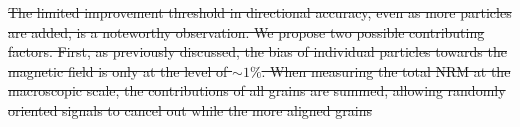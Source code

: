 \documentclass[onecolumn,12pt,a4paper]{article}
\providecommand{\DIFdeltex}[1]{{\protect\color{red}\sout{#1}}}                      %
\providecommand{\DIFaddbegin}{} %
\providecommand{\DIFdelbegin}{} %
\providecommand{\DIFdelend}{} %
\providecommand{\DIFdel}[1]{\texorpdfstring{\DIFdeltex{#1}}{}} %
\newcommand{\DIFscaledelfig}{0.5}
\newlength{\DIFdelgraphicswidth} %
\newlength{\DIFdelgraphicsheight} %
\newcommand{\DIFaddincludegraphics}[2][]{{\color{blue}\fbox{\DIFOincludegraphics[#1]{#2}}}} %
\newcommand{\DIFdelincludegraphics}[2][]{%
\sbox{\DIFdelgraphicsbox}{\DIFOincludegraphics[#1]{#2}}%
\settoboxwidth{\DIFdelgraphicswidth}{\DIFdelgraphicsbox} %
\settoboxtotalheight{\DIFdelgraphicsheight}{\DIFdelgraphicsbox} %
\scalebox{\DIFscaledelfig}{%
\parbox[b]{\DIFdelgraphicswidth}{\usebox{\DIFdelgraphicsbox}\\[-\baselineskip] \rule{\DIFdelgraphicswidth}{0em}}\llap{\resizebox{\DIFdelgraphicswidth}{\DIFdelgraphicsheight}{%
\setlength{\unitlength}{\DIFdelgraphicswidth}%
\begin{picture}(1,1)%
\thicklines\linethickness{2pt} %
{\color[rgb]{1,0,0}\put(0,0){\framebox(1,1){}}}%
{\color[rgb]{1,0,0}\put(0,0){\line( 1,1){1}}}%
{\color[rgb]{1,0,0}\put(0,1){\line(1,-1){1}}}%
\end{picture}%
}\hspace*{3pt}}} %
} %
\DeclareRobustCommand{\DIFaddbegin}{\DIFOaddbegin \let\includegraphics\DIFaddincludegraphics} %
\DeclareRobustCommand{\DIFdelbegin}{\DIFOdelbegin \let\includegraphics\DIFdelincludegraphics} %
\DeclareRobustCommand{\DIFdelend}{\DIFOaddend \let\includegraphics\DIFOincludegraphics} %
\begin{document}
\DIFdelbegin \DIFdel{The limited improvement threshold in directional accuracy, even as more particles are added, is a noteworthy observation. We propose two possible contributing factors. First, as previously discussed, the bias of individual particles towards the magnetic field is only at the level of $\sim1\%$. When measuring the total NRM at the macroscopic scale, the contributions of all grains are summed, allowing randomly oriented signals to cancel out while the more aligned grains }\DIFdelend %
\DIFaddbegin 
\end{document}
